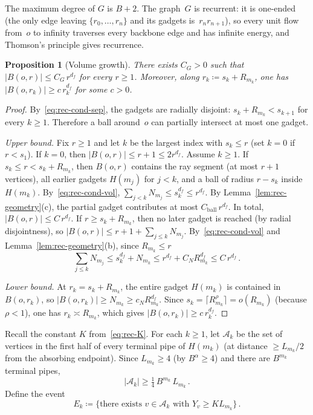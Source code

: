 \documentclass[aop]{imsart}
\theoremstyle{plain}
\newtheorem{proposition}[theorem]{Proposition}
\theoremstyle{definition}
\begin{document}
	The maximum degree of $G$ is $B{+}2$.  The graph~$G$ is recurrent: it is one-ended (the only edge leaving $\{r_0,\ldots,r_n\}$ and its gadgets is~$r_n r_{n+1}$), so every unit flow from~$o$ to infinity traverses every backbone edge and has infinite energy, and Thomson's principle \citep[Section~2.4]{LP16} gives recurrence.
	
	\begin{proposition}[Volume growth]
		\label{prop:rec-growth}
		There exists $C_G>0$ such that $|B(o,r)|\leq C_G\,r^{d_f}$ for every $r\geq 1$.  Moreover, along $r_k\coloneqq s_k+R_{m_k}$, one has $|B(o,r_k)|\geq c\,r_k^{d_f}$ for some $c>0$.
	\end{proposition}
	
	\begin{proof}
		By~\eqref{eq:rec-cond-sep}, the gadgets are radially disjoint: $s_k+R_{m_k}<s_{k+1}$ for every $k\geq 1$.  Therefore a ball around~$o$ can partially intersect at most one gadget.
		
		\emph{Upper bound.}  Fix $r\geq 1$ and let $k$ be the largest index with $s_k\leq r$ (set $k=0$ if $r<s_1$).  If $k=0$, then $|B(o,r)|\leq r{+}1\leq 2r^{d_f}$.  Assume $k\geq 1$.  If $s_k\leq r<s_k+R_{m_k}$, then $B(o,r)$ contains the ray segment (at most $r{+}1$ vertices), all earlier gadgets $H(m_j)$ for $j<k$, and a ball of radius $r{-}s_k$ inside $H(m_k)$.  By~\eqref{eq:rec-cond-vol}, $\sum_{j<k}N_{m_j}\leq s_k^{d_f}\leq r^{d_f}$.  By Lemma~\ref{lem:rec-geometry}(c), the partial gadget contributes at most $C_{\mathrm{ball}}\,r^{d_f}$.  In total, $|B(o,r)|\leq C\,r^{d_f}$.  If $r\geq s_k+R_{m_k}$, then no later gadget is reached (by radial disjointness), so $|B(o,r)|\leq r{+}1+\sum_{j\leq k}N_{m_j}$.  By~\eqref{eq:rec-cond-vol} and Lemma~\ref{lem:rec-geometry}(b), since $R_{m_k}\leq r$
		\[
		\sum_{j\leq k}N_{m_j} \leq s_k^{d_f}+N_{m_k} \leq r^{d_f}+C_N R_{m_k}^{d_f} \leq C\,r^{d_f}\,.
		\]
		
		\emph{Lower bound.}  At $r_k=s_k+R_{m_k}$, the entire gadget $H(m_k)$ is contained in $B(o,r_k)$, so $|B(o,r_k)|\geq N_{m_k}\geq c_N R_{m_k}^{d_f}$.  Since $s_k=\lceil R_{m_k}^{\rho}\rceil =o(R_{m_k})$ (because $\rho<1$), one has $r_k\asymp R_{m_k}$, which gives $|B(o,r_k)|\geq c\,r_k^{d_f}$.
	\end{proof}
	
	Recall the constant $K$ from~\eqref{eq:rec-K}.  For each $k\geq 1$, let $\mathcal{A}_k$ be the set of vertices in the first half of every terminal pipe of $H(m_k)$ (at distance $\geq L_{m_k}/2$ from the absorbing endpoint).  Since $L_{m_k}\geq 4$ (by $B^{\alpha}\geq 4$) and there are $B^{m_k}$ terminal pipes,
	\begin{equation}\label{eq:rec-Ak}
		|\mathcal{A}_k|\geq\tfrac{1}{4}\,
		B^{m_k}\,L_{m_k}\,.
	\end{equation}
	Define the event
	\begin{equation}
		E_k\coloneqq\bigl\{\text{there exists } v\in\mathcal{A}_k
		\text{ with } Y_v\geq K L_{m_k}\bigr\}\,.
	\end{equation}
	
\end{document}
